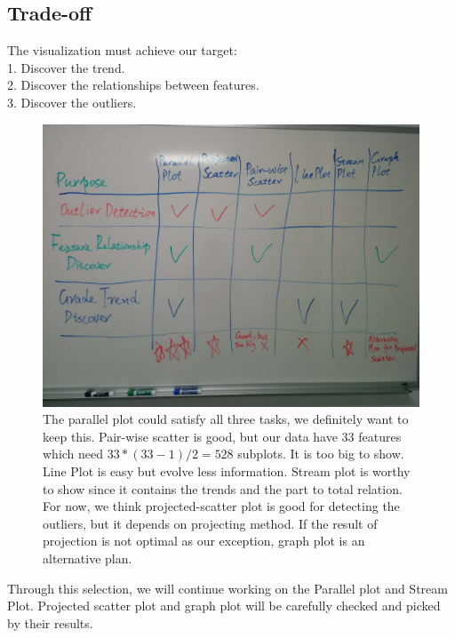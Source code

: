 \documentclass{article}
\begin{document}
\subsection{Trade-off}
The visualization must achieve our target:\\
1. Discover the trend. \\
2. Discover the relationships between features. \\
3. Discover the outliers.\\
\begin{figure}[H]
\centering
\includegraphics[scale=0.21]{compare.jpg}
\caption{The parallel plot could satisfy all three tasks, we definitely want to keep this. Pair-wise scatter is good, but our data have 33 features which need $33*(33-1)/2 = 528$ subplots. It is too big to show. Line Plot is easy but evolve less information. Stream plot is worthy to show since it contains the trends and the part to total relation. For now, we think projected-scatter plot is good for detecting the outliers, but it depends on projecting method. If the result of projection is not optimal as our exception, graph plot is an alternative plan.}
\end{figure}
Through this selection, we will continue working on the Parallel plot and Stream Plot. Projected scatter plot and graph plot will be carefully checked and picked by their results. 
\end{document}
